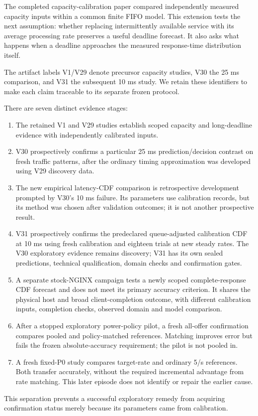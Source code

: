 \documentclass[11pt,a4paper]{article}
\begin{document}
The completed capacity-calibration paper \cite{capacityprecursor} compared independently measured
capacity inputs within a common finite FIFO model. This extension tests the
next assumption: whether replacing intermittently available service with its
average processing rate preserves a useful deadline forecast. It also asks
what happens when a deadline approaches the measured response-time
distribution itself.

The artifact labels V1/V29 denote precursor capacity studies, V30 the 25 ms
comparison, and V31 the subsequent 10 ms study. We retain these identifiers
to make each claim traceable to its separate frozen protocol.

There are seven distinct evidence stages:

\begin{enumerate}
\item The retained V1 and V29 studies establish scoped capacity and long-deadline
evidence with independently calibrated inputs.
\item V30 prospectively confirms a particular 25 ms prediction/decision contrast
on fresh traffic patterns, after the ordinary timing approximation was
developed using V29 discovery data.
\item The new empirical latency-CDF comparison is retrospective development
prompted by V30's 10 ms failure. Its parameters use calibration records,
but its method was chosen after validation outcomes; it is not another
prospective result.
\item V31 prospectively confirms the predeclared queue-adjusted calibration CDF at 10 ms
using fresh calibration and eighteen trials at new steady rates. The V30
exploratory evidence remains discovery; V31 has its own sealed predictions,
technical qualification, domain checks and confirmation gates.
\item A separate stock-NGINX campaign tests a newly scoped complete-response CDF
forecast and does not meet its primary accuracy criterion. It shares the
physical host and broad client-completion outcome, with different calibration
inputs, completion checks, observed domain and model comparison.
\item After a stopped exploratory power-policy pilot, a fresh all-offer confirmation
compares pooled and policy-matched references. Matching improves error but
fails the frozen absolute-accuracy requirement; the pilot is not pooled in.
\item A fresh fixed-P0 study compares target-rate and ordinary 5/s references.
Both transfer accurately, without the required incremental advantage from
rate matching. This later episode does not identify or repair the earlier cause.
\end{enumerate}
This separation prevents a successful exploratory remedy from acquiring
confirmation status merely because its parameters came from calibration.
\end{document}
